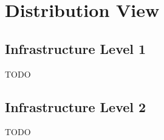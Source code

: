 \section{Distribution View}
\subsection{Infrastructure Level 1}
TODO
\subsection{Infrastructure Level 2}
TODO